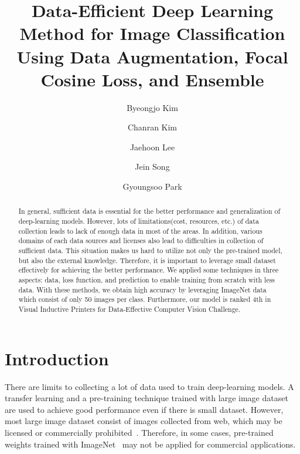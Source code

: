 \documentclass[runningheads]{llncs}
\begin{document}
\pagestyle{headings}
\mainmatter


\title{Data-Efficient Deep Learning Method for Image Classification Using Data Augmentation, Focal Cosine Loss, and Ensemble} 

\begin{comment}
\titlerunning{ECCV-20 submission ID \ECCVSubNumber} 
\authorrunning{ECCV-20 submission ID \ECCVSubNumber} 
\author{Anonymous ECCV submission}
\institute{Paper ID \ECCVSubNumber}
\end{comment}


\author{Byeongjo Kim \and
Chanran Kim \and 
Jaehoon Lee \and
Jein Song \and 
Gyoungsoo Park}



\maketitle

\begin{abstract}
In general, sufficient data is essential for the better performance and generalization of deep-learning models. However, lots of limitations(cost, resources, etc.) of data collection leads to lack of enough data in most of the areas. In addition, various domains of each data sources and licenses also lead to difficulties in collection of sufficient data. This situation makes us hard to utilize not only the pre-trained model, but also the external knowledge. Therefore, it is important to leverage small dataset effectively for achieving the better performance. We applied some techniques in three aspects: data, loss function, and prediction to enable training from scratch with less data. With these methods, we obtain high accuracy by leveraging ImageNet data which consist of only 50 images per class. Furthermore, our model is ranked 4th in Visual Inductive Printers for Data-Effective Computer Vision Challenge.
\end{abstract}

\section{Introduction}
There are limits to collecting a lot of data used to train deep-learning models. A transfer learning and a pre-training technique trained with large image dataset are used to achieve good performance even if there is small dataset. However, most large image dataset consist of images collected from web, which may be licensed or commercially prohibited~\cite{barz2020deep}. Therefore, in some cases, pre-trained weights trained with ImageNet~\cite{deng2009imagenet} may not be applied for commercial applications.
\end{document}
